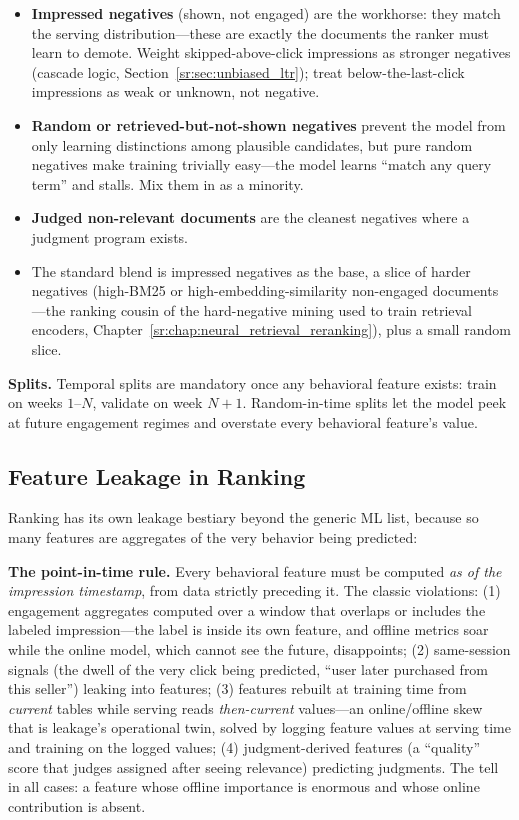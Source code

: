 \begin{itemize}
    \item \textbf{Impressed negatives} (shown, not engaged) are the workhorse: they match the serving distribution---these are exactly the documents the ranker must learn to demote. Weight skipped-above-click impressions as stronger negatives (cascade logic, Section~\ref{sr:sec:unbiased_ltr}); treat below-the-last-click impressions as weak or unknown, not negative.
    \item \textbf{Random or retrieved-but-not-shown negatives} prevent the model from only learning distinctions among plausible candidates, but pure random negatives make training trivially easy---the model learns ``match any query term'' and stalls. Mix them in as a minority.
    \item \textbf{Judged non-relevant documents} are the cleanest negatives where a judgment program exists.
    \item The standard blend is impressed negatives as the base, a slice of harder negatives (high-BM25 or high-embedding-similarity non-engaged documents---the ranking cousin of the hard-negative mining used to train retrieval encoders, Chapter~\ref{sr:chap:neural_retrieval_reranking}), plus a small random slice.
\end{itemize}

\textbf{Splits.} Temporal splits are mandatory once any behavioral feature exists: train on weeks $1$--$N$, validate on week $N{+}1$. Random-in-time splits let the model peek at future engagement regimes and overstate every behavioral feature's value.

\subsection{Feature Leakage in Ranking}

Ranking has its own leakage bestiary beyond the generic ML list, because so many features are aggregates of the very behavior being predicted:

\begin{warningbox}
\textbf{The point-in-time rule.} Every behavioral feature must be computed \textit{as of the impression timestamp}, from data strictly preceding it. The classic violations: (1) engagement aggregates computed over a window that overlaps or includes the labeled impression---the label is inside its own feature, and offline metrics soar while the online model, which cannot see the future, disappoints; (2) same-session signals (the dwell of the very click being predicted, ``user later purchased from this seller'') leaking into features; (3) features rebuilt at training time from \textit{current} tables while serving reads \textit{then-current} values---an online/offline skew that is leakage's operational twin, solved by logging feature values at serving time and training on the logged values; (4) judgment-derived features (a ``quality'' score that judges assigned after seeing relevance) predicting judgments. The tell in all cases: a feature whose offline importance is enormous and whose online contribution is absent.
\end{warningbox}

